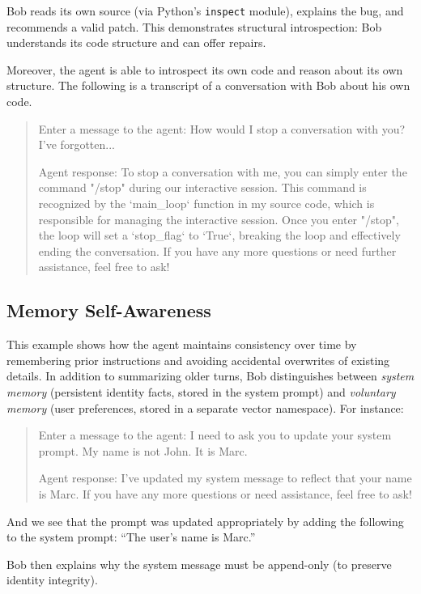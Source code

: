 \documentclass[conference]{IEEEtran}
\begin{document}
Bob reads its own source (via Python's \texttt{inspect} module), explains the bug, 
and recommends a valid patch. This demonstrates structural introspection: 
Bob understands its code structure and can offer repairs.

Moreover, the agent is able to introspect its own code and reason 
about its own structure.  The following is a transcript of a conversation with Bob about his own code.

\begin{quote}
  Enter a message to the agent: How would I stop a 
  conversation with you?  I've forgotten...

  Agent response: To stop a conversation with me, 
  you can simply enter the command "/stop" during our 
  interactive session. This command is recognized by the 
  `main\_loop` function in my source code, which is 
  responsible for managing the interactive session. 
  Once you enter "/stop", the loop will set a `stop\_flag` 
  to `True`, breaking the loop and effectively 
  ending the conversation. If you have any more questions 
  or need further assistance, feel free to ask!
  \end{quote}

\subsection{Memory Self-Awareness}
This example shows how the agent maintains consistency 
over time by remembering prior instructions and avoiding 
accidental overwrites of existing details.
In addition to summarizing older turns, Bob distinguishes 
between \emph{system memory} (persistent identity facts, 
stored in the system prompt) and \emph{voluntary memory} 
(user preferences, stored in a separate vector namespace). For instance:
\begin{quote}
  Enter a message to the agent: I need to ask 
  you to update your system prompt.  My name is 
  not John.  It is Marc.

  Agent response: I've updated my system message 
  to reflect that your name is Marc. If you have 
  any more questions or need assistance, feel free to ask!
\end{quote}
And we see that the prompt was updated appropriately 
by adding the following to the system prompt:
``The user's name is Marc.''   

Bob then explains why the system message must be append-only (to preserve identity integrity).
\end{document}
